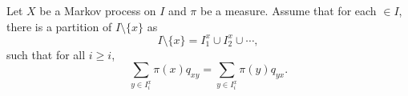 \documentclass[12pt]{article}
\begin{document}
\begin{lemma}
	Let $X$ be a Markov process on $I$ and $\pi$ be a measure. Assume that for each $ \in I$, there is a partition of $I \setminus \{x\}$ as
	\[
		I \setminus \{x\} = I_1^{x} \cup I_2^{x} \cup \cdots,
	\]
	such that for all $i \geq i$,
	\[
	\sum_{y \in I_i^{x}} \pi(x) q_{xy} = \sum_{y \in I_i^{x}} \pi(y) q_{yx}.
	\]
\end{lemma}


\newpage

\printindex
\end{document}
